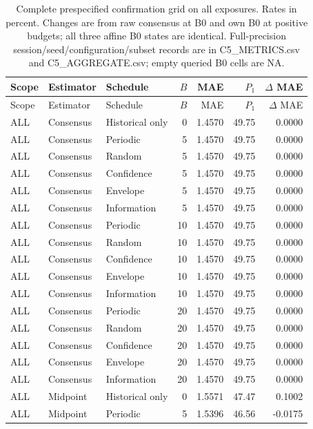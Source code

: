 \small\setlength{\tabcolsep}{4pt}
\begin{longtable}{lllrrrr}
\caption{Complete prespecified confirmation grid on all exposures. Rates in percent. Changes are from raw consensus at B0 and own B0 at positive budgets; all three affine B0 states are identical. Full-precision session/seed/configuration/subset records are in C5\_METRICS.csv and C5\_AGGREGATE.csv; empty queried B0 cells are NA.}\label{tab:sc5all}\\
\toprule
Scope & Estimator & Schedule & $B$ & MAE & $P_1$ & $\Delta$ MAE \\ \midrule\endfirsthead
\toprule
Scope & Estimator & Schedule & $B$ & MAE & $P_1$ & $\Delta$ MAE \\ \midrule\endhead
\bottomrule\endfoot
ALL & Consensus & Historical only & 0 & 1.4570 & 49.75 & 0.0000 \\
ALL & Consensus & Periodic & 5 & 1.4570 & 49.75 & 0.0000 \\
ALL & Consensus & Random & 5 & 1.4570 & 49.75 & 0.0000 \\
ALL & Consensus & Confidence & 5 & 1.4570 & 49.75 & 0.0000 \\
ALL & Consensus & Envelope & 5 & 1.4570 & 49.75 & 0.0000 \\
ALL & Consensus & Information & 5 & 1.4570 & 49.75 & 0.0000 \\
ALL & Consensus & Periodic & 10 & 1.4570 & 49.75 & 0.0000 \\
ALL & Consensus & Random & 10 & 1.4570 & 49.75 & 0.0000 \\
ALL & Consensus & Confidence & 10 & 1.4570 & 49.75 & 0.0000 \\
ALL & Consensus & Envelope & 10 & 1.4570 & 49.75 & 0.0000 \\
ALL & Consensus & Information & 10 & 1.4570 & 49.75 & 0.0000 \\
ALL & Consensus & Periodic & 20 & 1.4570 & 49.75 & 0.0000 \\
ALL & Consensus & Random & 20 & 1.4570 & 49.75 & 0.0000 \\
ALL & Consensus & Confidence & 20 & 1.4570 & 49.75 & 0.0000 \\
ALL & Consensus & Envelope & 20 & 1.4570 & 49.75 & 0.0000 \\
ALL & Consensus & Information & 20 & 1.4570 & 49.75 & 0.0000 \\
ALL & Midpoint & Historical only & 0 & 1.5571 & 47.47 & 0.1002 \\
ALL & Midpoint & Periodic & 5 & 1.5396 & 46.56 & -0.0175 \\

\end{longtable}
